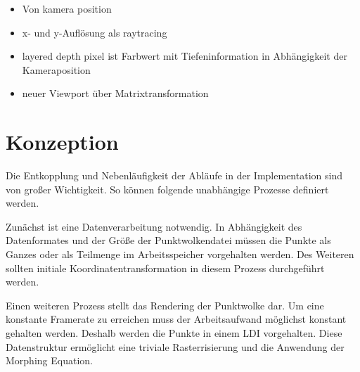 \documentclass[hyperref, beleg, german]{cgvpub}
\begin{document}
\begin{itemize}
	\item Von kamera position
	\item x- und y-Auflösung als raytracing
	\item layered depth pixel ist Farbwert mit Tiefeninformation in Abhängigkeit der
	      Kameraposition
	\item neuer Viewport über Matrixtransformation
\end{itemize}

\chapter{Konzeption}

Die Entkopplung und Nebenläufigkeit der Abläufe in der Implementation sind von
großer Wichtigkeit. So können folgende unabhängige Prozesse definiert werden.

Zunächst ist eine Datenverarbeitung notwendig. In Abhängigkeit des
Datenformates und der Größe der Punktwolkendatei müssen die Punkte als Ganzes
oder als Teilmenge im Arbeitsspeicher vorgehalten werden. Des Weiteren sollten
initiale Koordinatentransformation in diesem Prozess durchgeführt werden.

Einen weiteren Prozess stellt das Rendering der Punktwolke dar. Um eine
konstante Framerate zu erreichen muss der Arbeitsaufwand möglichst konstant
gehalten werden. Deshalb werden die Punkte in einem LDI vorgehalten. Diese
Datenstruktur ermöglicht eine triviale Rasterrisierung und die Anwendung der
Morphing Equation.
\end{document}
